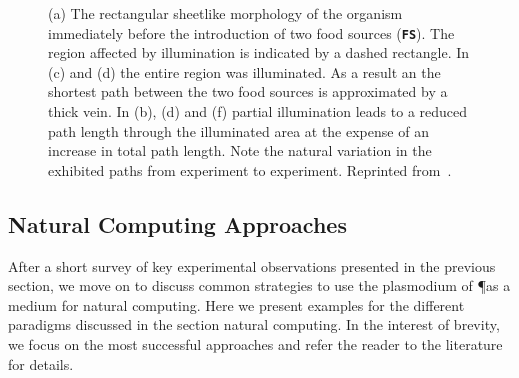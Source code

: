 			\begin{figure}[htp]
				\centering
				\newline
				\newline

				\caption[Classic maze experiment with \P]{(a)  The  rectangular  sheetlike  morphology  of  the organism  immediately  before  the  introduction  of  two  food sources (\textbf{\texttt{FS}}). The region affected by illumination is indicated by a dashed rectangle. In (c) and (d) the entire region was illuminated. As a result an the shortest path between the two food sources is approximated by a thick vein. In (b), (d) and (f) partial illumination leads to a reduced path length through the illuminated area at the expense of an increase in total path length. Note the natural variation in the exhibited paths from experiment to experiment. Reprinted from~\cite{PhysRevLett.99.068104}.}
				\label{fig:snell}
			\end{figure}

			\FloatBarrier

	\subsection{Natural Computing Approaches}

		After a short survey of key experimental observations presented in the previous section, we move on to discuss common strategies to use the plasmodium of \P as a medium for natural computing. Here we present examples for the different paradigms discussed in the section natural computing. In the interest of brevity, we focus on the most successful approaches and refer the reader to the literature for details.

